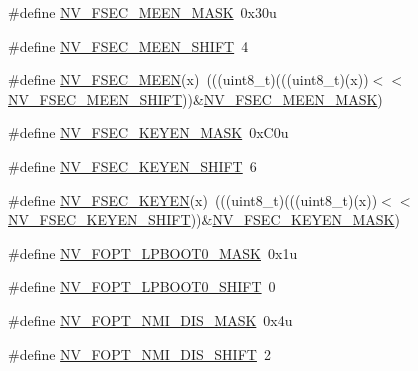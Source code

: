 \begin{DoxyCompactItemize}
\item 
\#define \hyperlink{group___n_v___register___masks_ga02f5aa86e1f5bceefd0378fa736d5656}{N\+V\+\_\+\+F\+S\+E\+C\+\_\+\+M\+E\+E\+N\+\_\+\+M\+A\+SK}~0x30u
\item 
\#define \hyperlink{group___n_v___register___masks_ga13adfbdf46af9e59b446d17ce90b49c1}{N\+V\+\_\+\+F\+S\+E\+C\+\_\+\+M\+E\+E\+N\+\_\+\+S\+H\+I\+FT}~4
\item 
\#define \hyperlink{group___n_v___register___masks_ga6a3e909b41d8dd2ca5f55b10e8cc4e52}{N\+V\+\_\+\+F\+S\+E\+C\+\_\+\+M\+E\+EN}(x)~(((uint8\+\_\+t)(((uint8\+\_\+t)(x))$<$$<$\hyperlink{group___n_v___register___masks_ga13adfbdf46af9e59b446d17ce90b49c1}{N\+V\+\_\+\+F\+S\+E\+C\+\_\+\+M\+E\+E\+N\+\_\+\+S\+H\+I\+FT}))\&\hyperlink{group___n_v___register___masks_ga02f5aa86e1f5bceefd0378fa736d5656}{N\+V\+\_\+\+F\+S\+E\+C\+\_\+\+M\+E\+E\+N\+\_\+\+M\+A\+SK})
\item 
\#define \hyperlink{group___n_v___register___masks_ga50a87e963eeaaf5fdb904e7bac9099af}{N\+V\+\_\+\+F\+S\+E\+C\+\_\+\+K\+E\+Y\+E\+N\+\_\+\+M\+A\+SK}~0x\+C0u
\item 
\#define \hyperlink{group___n_v___register___masks_ga3df55e24a4dc42a19afc15b4a3137bae}{N\+V\+\_\+\+F\+S\+E\+C\+\_\+\+K\+E\+Y\+E\+N\+\_\+\+S\+H\+I\+FT}~6
\item 
\#define \hyperlink{group___n_v___register___masks_gaca6379e60e0371d1d0c8493abe9db870}{N\+V\+\_\+\+F\+S\+E\+C\+\_\+\+K\+E\+Y\+EN}(x)~(((uint8\+\_\+t)(((uint8\+\_\+t)(x))$<$$<$\hyperlink{group___n_v___register___masks_ga3df55e24a4dc42a19afc15b4a3137bae}{N\+V\+\_\+\+F\+S\+E\+C\+\_\+\+K\+E\+Y\+E\+N\+\_\+\+S\+H\+I\+FT}))\&\hyperlink{group___n_v___register___masks_ga50a87e963eeaaf5fdb904e7bac9099af}{N\+V\+\_\+\+F\+S\+E\+C\+\_\+\+K\+E\+Y\+E\+N\+\_\+\+M\+A\+SK})
\item 
\#define \hyperlink{group___n_v___register___masks_ga47bf10ef60ce96fc8d7fdbd7378d9a52}{N\+V\+\_\+\+F\+O\+P\+T\+\_\+\+L\+P\+B\+O\+O\+T0\+\_\+\+M\+A\+SK}~0x1u
\item 
\#define \hyperlink{group___n_v___register___masks_ga342e15fe4074c4a1bef9dcd73b312b56}{N\+V\+\_\+\+F\+O\+P\+T\+\_\+\+L\+P\+B\+O\+O\+T0\+\_\+\+S\+H\+I\+FT}~0
\item 
\#define \hyperlink{group___n_v___register___masks_gaa2bcf41c89cbfe86ef8eaf6fff2ad068}{N\+V\+\_\+\+F\+O\+P\+T\+\_\+\+N\+M\+I\+\_\+\+D\+I\+S\+\_\+\+M\+A\+SK}~0x4u
\item 
\#define \hyperlink{group___n_v___register___masks_ga8a4632e08257c81a80d8be3cdac911f9}{N\+V\+\_\+\+F\+O\+P\+T\+\_\+\+N\+M\+I\+\_\+\+D\+I\+S\+\_\+\+S\+H\+I\+FT}~2

\end{DoxyCompactItemize}
